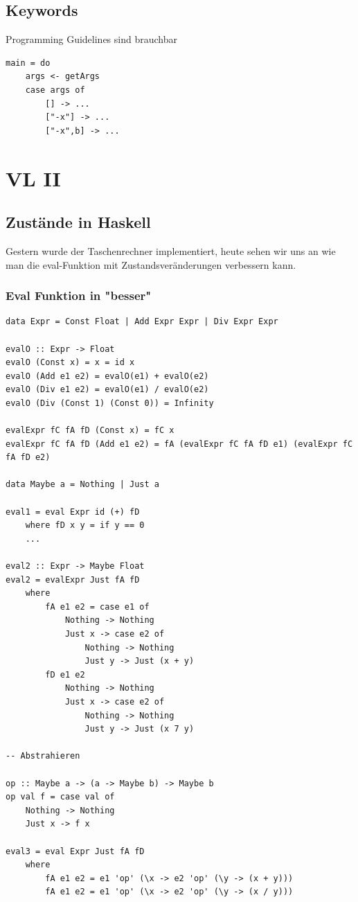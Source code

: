 \documentclass[ngerman,a4paper]{report}
\begin{document}
\section{Keywords}
Programming Guidelines sind brauchbar
\begin{lstlisting}
main = do 
	args <- getArgs
	case args of
		[] -> ...
		["-x"] -> ...
		["-x",b] -> ...
\end{lstlisting}

\chapter{VL II}
\section{Zustände in Haskell}
Gestern wurde der Taschenrechner implementiert, heute sehen wir uns an wie man die eval-Funktion mit Zustandsveränderungen verbessern kann.
\subsection{Eval Funktion in "besser"}
\begin{lstlisting}
data Expr = Const Float | Add Expr Expr | Div Expr Expr

evalO :: Expr -> Float
evalO (Const x) = x = id x
evalO (Add e1 e2) = evalO(e1) + evalO(e2)
evalO (Div e1 e2) = evalO(e1) / evalO(e2)
evalO (Div (Const 1) (Const 0)) = Infinity

evalExpr fC fA fD (Const x) = fC x
evalExpr fC fA fD (Add e1 e2) = fA (evalExpr fC fA fD e1) (evalExpr fC fA fD e2)

data Maybe a = Nothing | Just a

eval1 = eval Expr id (+) fD
	where fD x y = if y == 0
	...

eval2 :: Expr -> Maybe Float
eval2 = evalExpr Just fA fD
	where
		fA e1 e2 = case e1 of
			Nothing -> Nothing
			Just x -> case e2 of
				Nothing -> Nothing
				Just y -> Just (x + y)
		fD e1 e2
			Nothing -> Nothing
			Just x -> case e2 of
				Nothing -> Nothing
				Just y -> Just (x 7 y)

-- Abstrahieren

op :: Maybe a -> (a -> Maybe b) -> Maybe b
op val f = case val of
	Nothing -> Nothing
	Just x -> f x

eval3 = eval Expr Just fA fD
	where 
		fA e1 e2 = e1 'op' (\x -> e2 'op' (\y -> (x + y)))
		fA e1 e2 = e1 'op' (\x -> e2 'op' (\y -> (x / y)))
\end{lstlisting}
\end{document}
